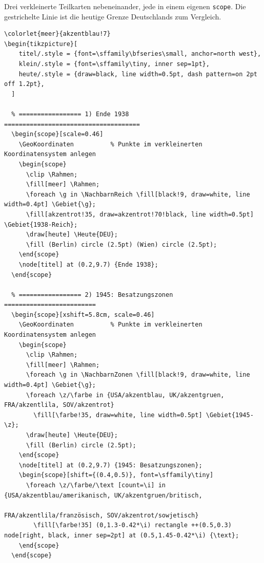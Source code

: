Drei verkleinerte Teilkarten nebeneinander, jede in einem eigenen \texttt{scope}. Die gestrichelte Linie ist die heutige Grenze Deutschlands zum Vergleich.

\begin{lstlisting}[style=latex]
% Präambel: 
\colorlet{meer}{akzentblau!7}
\begin{tikzpicture}[
    titel/.style = {font=\sffamily\bfseries\small, anchor=north west},
    klein/.style = {font=\sffamily\tiny, inner sep=1pt},
    heute/.style = {draw=black, line width=0.5pt, dash pattern=on 2pt off 1.2pt},
  ]

  % ================= 1) Ende 1938 =====================================
  \begin{scope}[scale=0.46]
    \GeoKoordinaten          % Punkte im verkleinerten Koordinatensystem anlegen
    \begin{scope}
      \clip \Rahmen;
      \fill[meer] \Rahmen;
      \foreach \g in \NachbarnReich \fill[black!9, draw=white, line width=0.4pt] \Gebiet{\g};
      \fill[akzentrot!35, draw=akzentrot!70!black, line width=0.5pt] \Gebiet{1938-Reich};
      \draw[heute] \Heute{DEU};
      \fill (Berlin) circle (2.5pt) (Wien) circle (2.5pt);
    \end{scope}
    \node[titel] at (0.2,9.7) {Ende 1938};
  \end{scope}

  % ================= 2) 1945: Besatzungszonen =========================
  \begin{scope}[xshift=5.8cm, scale=0.46]
    \GeoKoordinaten          % Punkte im verkleinerten Koordinatensystem anlegen
    \begin{scope}
      \clip \Rahmen;
      \fill[meer] \Rahmen;
      \foreach \g in \NachbarnZonen \fill[black!9, draw=white, line width=0.4pt] \Gebiet{\g};
      \foreach \z/\farbe in {USA/akzentblau, UK/akzentgruen, FRA/akzentlila, SOV/akzentrot}
        \fill[\farbe!35, draw=white, line width=0.5pt] \Gebiet{1945-\z};
      \draw[heute] \Heute{DEU};
      \fill (Berlin) circle (2.5pt);
    \end{scope}
    \node[titel] at (0.2,9.7) {1945: Besatzungszonen};
    \begin{scope}[shift={(0.4,0.5)}, font=\sffamily\tiny]
      \foreach \z/\farbe/\text [count=\i] in {USA/akzentblau/amerikanisch, UK/akzentgruen/britisch,
                                             FRA/akzentlila/französisch, SOV/akzentrot/sowjetisch}
        \fill[\farbe!35] (0,1.3-0.42*\i) rectangle ++(0.5,0.3) node[right, black, inner sep=2pt] at (0.5,1.45-0.42*\i) {\text};
    \end{scope}
  \end{scope}


\end{lstlisting}
